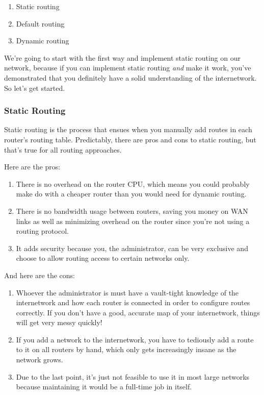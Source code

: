 \begin{enumerate}
\tightlist
\item
  Static routing
\item
  Default routing
\item
  Dynamic routing
\end{enumerate}

We're going to start with the first way and implement static routing on
our network, because if you can implement static routing \emph{and} make
it work, you've demonstrated that you definitely have a solid
understanding of the internetwork. So let's get started.

\subsubsection[Static
Routing]{\texorpdfstring{\protect\hypertarget{c09.xhtmlux5cux23c09-sec-10}{}{}Static
Routing}{Static Routing}}

Static routing is the process that ensues when you manually add routes
in each router's routing table. Predictably, there are pros and cons to
static routing, but that's true for all routing approaches.

Here are the pros:

\begin{enumerate}
\tightlist
\item
  There is no overhead on the router CPU, which means you could probably
  make do with a cheaper router than you would need for dynamic routing.
\item
  There is no bandwidth usage between routers, saving you money on WAN
  links as well as minimizing overhead on the router since you're not
  using a routing protocol.
\item
  It adds security because you, the administrator, can be very exclusive
  and choose to allow routing access to certain networks only.
\end{enumerate}

And here are the cons:

\begin{enumerate}
\tightlist
\item
  Whoever the administrator is must have a vault-tight knowledge of the
  internetwork and how each router is connected in order to configure
  routes correctly. If you don't have a good, accurate map of your
  internetwork, things will get very messy quickly!
\item
  If you add a network to the internetwork, you have to tediously add a
  route to it on all routers by hand, which only gets increasingly
  insane as the network grows.
\item
  Due to the last point, it's just not feasible to use it in most large
  networks because maintaining it would be a full-time job in itself.
\end{enumerate}

